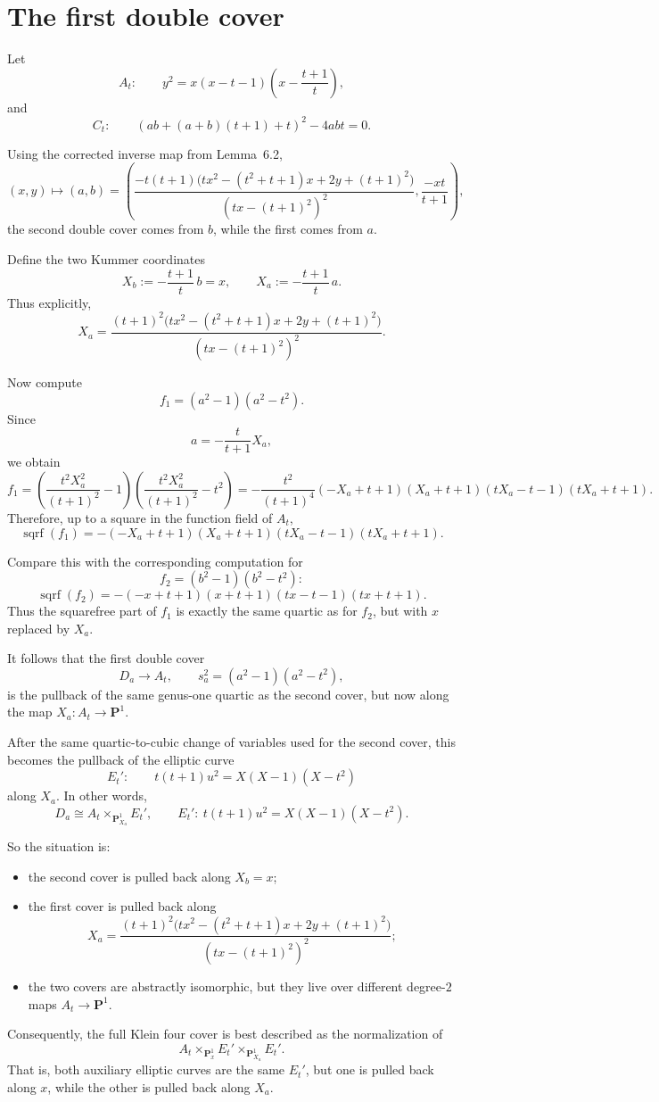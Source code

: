 \documentclass[11 pt]{amsart}
\numberwithin{equation}{section}
\begin{document}
\section*{The first double cover}

Let
\[
A_t:\qquad y^2=x(x-t-1)\left(x-\frac{t+1}{t}\right),
\]
and
\[
C_t:\qquad (ab+(a+b)(t+1)+t)^2-4abt=0.
\]

Using the corrected inverse map from Lemma~6.2,
\[
(x,y)\longmapsto (a,b)
=
\left(
\frac{-t(t+1)\bigl(tx^2-(t^2+t+1)x+2y+(t+1)^2\bigr)}{(tx-(t+1)^2)^2},
\frac{-xt}{t+1}
\right),
\]
the second double cover comes from \(b\), while the first comes from \(a\).

Define the two Kummer coordinates
\[
X_b:=-\frac{t+1}{t}\,b=x,
\qquad
X_a:=-\frac{t+1}{t}\,a.
\]
Thus explicitly,
\[
\boxed{
X_a=
\frac{(t+1)^2\bigl(tx^2-(t^2+t+1)x+2y+(t+1)^2\bigr)}{(tx-(t+1)^2)^2}.
}
\]

Now compute
\[
f_1=(a^2-1)(a^2-t^2).
\]
Since
\[
a=-\frac{t}{t+1}X_a,
\]
we obtain
\[
f_1
=
\left(\frac{t^2X_a^2}{(t+1)^2}-1\right)
\left(\frac{t^2X_a^2}{(t+1)^2}-t^2\right)
=
-\frac{t^2}{(t+1)^4}
(-X_a+t+1)(X_a+t+1)(tX_a-t-1)(tX_a+t+1).
\]
Therefore, up to a square in the function field of \(A_t\),
\[
\boxed{
\operatorname{sqrf}(f_1)
=
-(-X_a+t+1)(X_a+t+1)(tX_a-t-1)(tX_a+t+1).
}
\]

Compare this with the corresponding computation for
\[
f_2=(b^2-1)(b^2-t^2):
\]
\[
\operatorname{sqrf}(f_2)
=
-(-x+t+1)(x+t+1)(tx-t-1)(tx+t+1).
\]
Thus the squarefree part of \(f_1\) is exactly the same quartic as for \(f_2\), but with \(x\) replaced by \(X_a\).

It follows that the first double cover
\[
D_a\to A_t,\qquad s_a^2=(a^2-1)(a^2-t^2),
\]
is the pullback of the same genus-one quartic as the second cover, but now along the map \(X_a:A_t\to \mathbf P^1\).

After the same quartic-to-cubic change of variables used for the second cover, this becomes the pullback of the elliptic curve
\[
E_t':\qquad t(t+1)u^2=X(X-1)(X-t^2)
\]
along \(X_a\). In other words,
\[
\boxed{
D_a \cong A_t\times_{\mathbf P^1_{X_a}} E_t',
\qquad
E_t':\ t(t+1)u^2=X(X-1)(X-t^2).
}
\]

So the situation is:
\begin{itemize}
    \item the second cover is pulled back along \(X_b=x\);
    \item the first cover is pulled back along
    \[
    \boxed{
    X_a=
    \frac{(t+1)^2\bigl(tx^2-(t^2+t+1)x+2y+(t+1)^2\bigr)}{(tx-(t+1)^2)^2};
    }
    \]
    \item the two covers are abstractly isomorphic, but they live over different degree-\(2\) maps \(A_t\to \mathbf P^1\).
\end{itemize}

Consequently, the full Klein four cover is best described as the normalization of
\[
\boxed{
A_t
\times_{\mathbf P^1_x} E_t'
\times_{\mathbf P^1_{X_a}} E_t'.
}
\]
That is, both auxiliary elliptic curves are the same \(E_t'\), but one is pulled back along \(x\), while the other is pulled back along \(X_a\).
\end{document}
